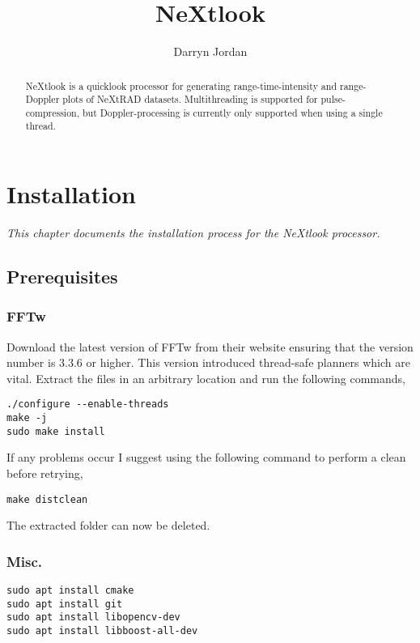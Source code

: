\documentclass[a4paper,11pt]{report}
\title{NeXtlook}
\author{Darryn Jordan}
\begin{document}
\maketitle
\tableofcontents

\begin{abstract}
NeXtlook is a quicklook processor for generating range-time-intensity and range-Doppler plots of NeXtRAD datasets. Multithreading is supported for pulse-compression, but Doppler-processing is currently only supported when using a single thread.
\end{abstract}

\chapter{Installation}
\textit{This chapter documents the installation process for the NeXtlook processor.}
\section{Prerequisites}
\subsection{FFTw}
Download the latest version of FFTw from their website ensuring that the version number is 3.3.6 or higher. This version introduced thread-safe planners which are vital. 
Extract the files in an arbitrary location and run the following commands,
\begin{lstlisting}
./configure --enable-threads
make -j
sudo make install
\end{lstlisting}
If any problems occur I suggest using the following command to perform a clean before retrying,
\begin{lstlisting}
make distclean
\end{lstlisting}
The extracted folder can now be deleted.
\subsection{Misc.}
\begin{lstlisting}
sudo apt install cmake
sudo apt install git
sudo apt install libopencv-dev
sudo apt install libboost-all-dev
\end{lstlisting}
\end{document}
